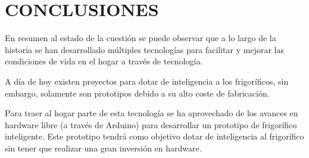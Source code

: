 \section{CONCLUSIONES}

En resumen al estado de la cuestión se puede observar que a lo largo de la historia se han desarrollado múltiples tecnologías para facilitar y mejorar las condiciones de vida en el hogar a través de tecnología.


A día de hoy existen proyectos para dotar de inteligencia a los frigoríficos, sin embargo, solamente son prototipos debido a su alto coste de fabricación.

Para traer al hogar parte de esta tecnología se ha aprovechado de los avances en hardware libre (a través de Arduino) para desarrollar un prototipo de frigorífico inteligente. Este prototipo tendrá como objetivo dotar de inteligencia al frigorífico sin tener que realizar una gran inversión en hardware.